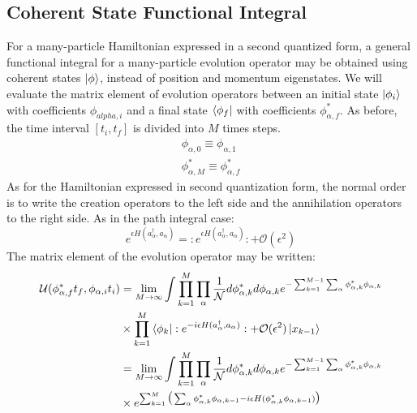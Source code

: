 \documentclass[12pt]{article}
\begin{document}
\subsection*{Coherent State Functional Integral}
For a many-particle Hamiltonian expressed in a second quantized form, a general 
functional integral for a many-particle evolution operator may be obtained using 
 coherent states $\ket{\phi}$, instead of position and momentum eigenstates. We 
 will evaluate the matrix element of evolution operators between an initial state 
 $\ket{\phi_i}$ with coefficients $\phi_{alpha,i}$ and a final state $\bra{\phi_f}$ 
 with coefficients $\phi^*_{\alpha,f}$. As before, the time interval $[t_i,t_f]$ 
 is divided into $M$ times steps. 
 \begin{equation*}
     \begin{split}
         \phi_{\alpha,0}\equiv\phi_{\alpha,1}\\
         \phi^*_{\alpha,M}\equiv\phi^*_{\alpha,f}
     \end{split}
 \end{equation*}
 As for the Hamiltonian expressed in second quantization form, the normal order is 
 to write the creation operators to the left side and the annihilation operators to 
 the right side. As in the path integral case: 
 \begin{equation*}
     e^{\epsilon H(a^\dagger_\alpha,a_\alpha)}=
     :e^{\epsilon H(a^\dagger_\alpha,a_\alpha)}:+\mathcal{O}(\epsilon^2)
 \end{equation*}
 The matrix element of the evolution operator may be written:
 \begin{equation}
     \begin{split}
         \mathcal{U}(\phi^*_{\alpha,f}t_f,\phi_{\alpha,i}t_i)&=\lim_{M\rightarrow\infty}
         \int\prod_{k=1}^M\prod_\alpha\frac{1}{\mathcal{N}}d\phi^*_{\alpha,k}
         d\phi_{\alpha,k}e^{-\sum_{k=1}^{M-1}\sum_\alpha\phi^*_{\alpha,k}\phi_{\alpha,k}}\\
         &\times\prod_{k=1}^M\bra{\phi_k}:e^{-i\epsilon H(a^\dagger_\alpha,a_\alpha)}:
         +\mathcal{O}(\epsilon^2)\ket{x_{k-1}}\\
         &=\lim_{M\rightarrow\infty}\int\prod_{k=1}^M\prod_\alpha\frac{1}{\mathcal{N}}d\phi^*_{\alpha,k}
         d\phi_{\alpha,k}e^{-\sum_{k=1}^{M-1}\sum_\alpha\phi^*_{\alpha,k}\phi_{\alpha,k}}\\
         &\times e^{\sum_{k=1}^M\big(\sum_\alpha\phi^*_{\alpha,k}\phi_{\alpha,k-1}
         -i\epsilon H(\phi^*_{\alpha,k}\phi_{\alpha,k-1})\big)}
     \end{split}
 \end{equation}
\end{document}
